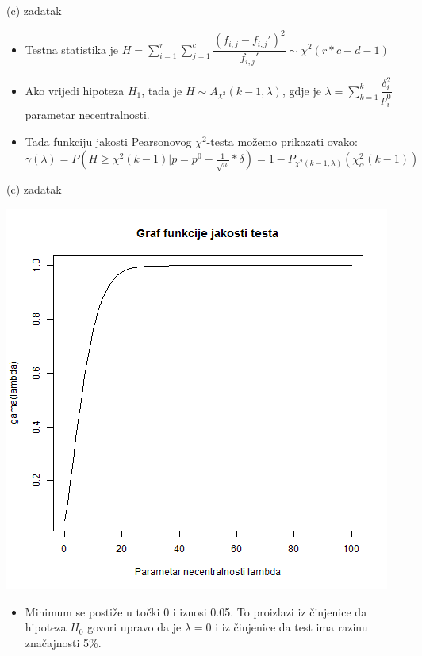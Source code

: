 \documentclass{beamer}
\begin{document}
\begin{frame}{(c) zadatak}
\begin{itemize}
\item Testna statistika je $H=\sum_{i=1}^{r} \sum_{j=1}^{c} \dfrac{(f_{i,j}-f_{i,j}')^2}{f_{i,j}'} \sim \chi^2(r*c-d-1)$\\
\item Ako vrijedi hipoteza $H_{1}$, tada je $H\sim A_{\chi^2} (k-1,\lambda)$, gdje je $\lambda=\sum_{k=1}^k \dfrac{\delta_{i}^2}{p_{i}^0}$ parametar
necentralnosti.\\
\item Tada funkciju jakosti Pearsonovog $\chi^2$-testa možemo prikazati ovako:\\
$\gamma(\lambda)=P(H\geq \chi^2(k-1)|p=p^0-\frac{1}{\sqrt{n}}*\delta)=1-P_{\chi^2(k-1,\lambda)}(\chi_{\alpha}^2 (k-1))$\\
\end{itemize}
\end{frame}

\begin{frame}{(c) zadatak}
\begin{center}
\includegraphics[scale=0.27]{3.png}\\
\end{center}
\begin{itemize}
\item Minimum se postiže u točki 0 i iznosi 0.05. To proizlazi iz činjenice da hipoteza $H_{0}$ govori upravo da je $\lambda=0$ i iz činjenice da test ima razinu značajnosti 5\%.\\
\end{itemize}
\end{frame}
\end{document}
